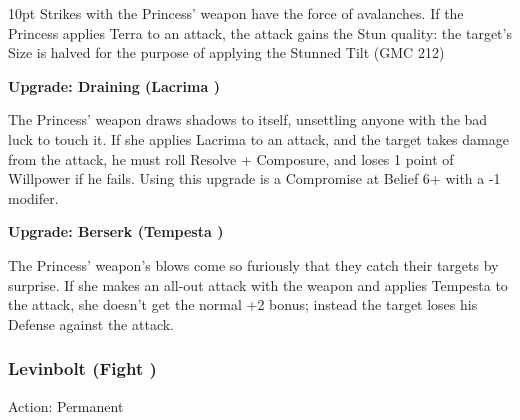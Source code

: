 \begin{myindentpar}{10pt}
Strikes with the Princess' weapon have the force of avalanches. If the Princess applies Terra to an attack, the attack gains the Stun quality: the target's Size is halved for the purpose of applying the Stunned Tilt (GMC 212)

\textbf{Upgrade: Draining (Lacrima \textbullet\textbullet)}

The Princess' weapon draws shadows to itself, unsettling anyone with the bad luck to touch it. If she applies Lacrima to an attack, and the target takes damage from the attack, he must roll Resolve + Composure, and loses 1 point of Willpower if he fails. Using this upgrade is a Compromise at Belief 6+ with a -1 modifer.

\textbf{Upgrade: Berserk (Tempesta \textbullet\textbullet)}

The Princess' weapon's blows come so furiously that they catch their targets by surprise. If she makes an all-out attack with the weapon and applies Tempesta to the attack, she doesn't get the normal +2 bonus; instead the target loses his Defense against the attack.\end{myindentpar}




\subsubsection*{Levinbolt (Fight \textbullet)}

\noindent Action: Permanent\\

